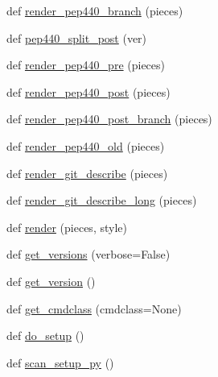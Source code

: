 \begin{DoxyCompactItemize}
def \hyperlink{namespaceversioneer_a3e920b961ce90f0fc3f49cccaebc9918}{render\+\_\+pep440\+\_\+branch} (pieces)
\item 
def \hyperlink{namespaceversioneer_a8e584b4246d09746940fe349e5251213}{pep440\+\_\+split\+\_\+post} (ver)
\item 
def \hyperlink{namespaceversioneer_a63ca46b89d8dc2fe09c7e3d65cc44f71}{render\+\_\+pep440\+\_\+pre} (pieces)
\item 
def \hyperlink{namespaceversioneer_ae5d8a1b4751ce8875001c1ca70d33da4}{render\+\_\+pep440\+\_\+post} (pieces)
\item 
def \hyperlink{namespaceversioneer_aa5a422af4804aafb129d4206d50d1816}{render\+\_\+pep440\+\_\+post\+\_\+branch} (pieces)
\item 
def \hyperlink{namespaceversioneer_aeb727e76518be99a5cf86ddd8f7e4342}{render\+\_\+pep440\+\_\+old} (pieces)
\item 
def \hyperlink{namespaceversioneer_aec71e41845cbfe2d55fb138d90b17440}{render\+\_\+git\+\_\+describe} (pieces)
\item 
def \hyperlink{namespaceversioneer_a344d827c720edf120ec69b42d052263a}{render\+\_\+git\+\_\+describe\+\_\+long} (pieces)
\item 
def \hyperlink{namespaceversioneer_a597f5f4b8e0048fcff33a55857631520}{render} (pieces, style)
\item 
def \hyperlink{namespaceversioneer_a8b2824586f2d033c523adca6c108394c}{get\+\_\+versions} (verbose=False)
\item 
def \hyperlink{namespaceversioneer_a04a68e97508b9bd277097bf2644545bd}{get\+\_\+version} ()
\item 
def \hyperlink{namespaceversioneer_ac032e254c046410f09612d27049516f3}{get\+\_\+cmdclass} (cmdclass=None)
\item 
def \hyperlink{namespaceversioneer_a366c0b90d2355ed3559a4959cf1f2a82}{do\+\_\+setup} ()
\item 
def \hyperlink{namespaceversioneer_ab49eb549b832b1d5cb43fe660f17342d}{scan\+\_\+setup\+\_\+py} ()
\end{DoxyCompactItemize}
